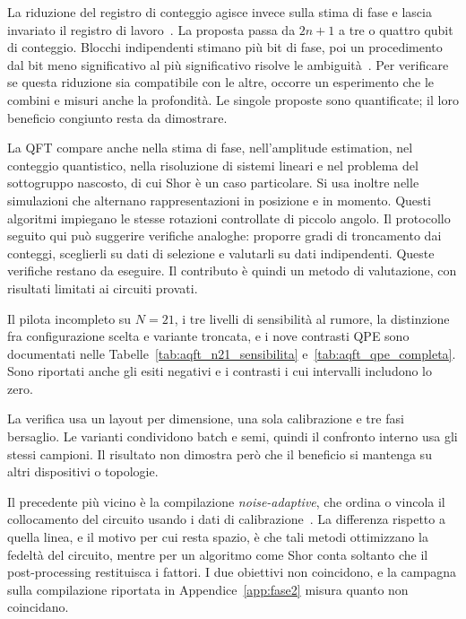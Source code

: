 \begin{onehalfspace}
La riduzione del registro di conteggio agisce invece sulla stima di fase e lascia invariato il registro di lavoro~\cite{shukla2026}. La proposta passa da $2n+1$ a tre o quattro qubit di conteggio. Blocchi indipendenti stimano più bit di fase, poi un procedimento dal bit meno significativo al più significativo risolve le ambiguità~\cite{shuklaqpe2026}. Per verificare se questa riduzione sia compatibile con le altre, occorre un esperimento che le combini e misuri anche la profondità. Le singole proposte sono quantificate; il loro beneficio congiunto resta da dimostrare.

La QFT compare anche nella stima di fase, nell'amplitude estimation, nel conteggio quantistico, nella risoluzione di sistemi lineari e nel problema del sottogruppo nascosto, di cui Shor è un caso particolare. Si usa inoltre nelle simulazioni che alternano rappresentazioni in posizione e in momento. Questi algoritmi impiegano le stesse rotazioni controllate di piccolo angolo. Il protocollo seguito qui può suggerire verifiche analoghe: proporre gradi di troncamento dai conteggi, sceglierli su dati di selezione e valutarli su dati indipendenti. Queste verifiche restano da eseguire. Il contributo è quindi un metodo di valutazione, con risultati limitati ai circuiti provati.

Il pilota incompleto su $N=21$, i tre livelli di sensibilità al rumore,
la distinzione fra configurazione scelta e variante troncata, e i nove
contrasti QPE sono documentati nelle Tabelle~\ref{tab:aqft_n21_sensibilita}
e~\ref{tab:aqft_qpe_completa}. Sono riportati anche gli esiti negativi
e i contrasti i cui intervalli includono lo zero.

La verifica usa un layout per dimensione, una sola calibrazione e tre fasi bersaglio. Le varianti condividono batch e semi, quindi il confronto interno usa gli stessi campioni. Il risultato non dimostra però che il beneficio si mantenga su altri dispositivi o topologie.

Il precedente più vicino è la compilazione \emph{noise-adaptive}, che ordina o vincola il
collocamento del circuito usando i dati di calibrazione~\cite{murali2019, tannu2019}. La
differenza rispetto a quella linea, e il motivo per cui resta spazio, è che tali metodi
ottimizzano la fedeltà del circuito, mentre per un algoritmo come Shor conta soltanto che
il post-processing restituisca i fattori. I due obiettivi non coincidono, e la campagna
sulla compilazione riportata in Appendice~\ref{app:fase2} misura quanto non coincidano.


\end{onehalfspace}
